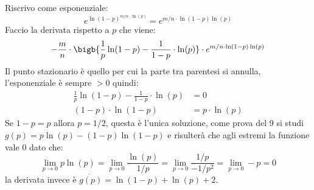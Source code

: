 Riscrivo come esponenziale:
\begin{equation*}
    e^{\ln(1 - p)^{m/n \cdot \ln(p)}} = e^{m/n \cdot \ln(1 - p)\ln(p)}
\end{equation*}
Faccio la derivata rispetto a $p$ che viene:
\begin{equation*}
    -\frac{m}{n} \cdot \bigb{\frac{1}{p}\ln(1 - p) - \frac{1}{1 - p} \cdot \ln(p)} \cdot e^{m/n \cdot \ln(1 - p)\ln(p)}
\end{equation*}
Il punto stazionario è quello per cui la parte tra parentesi si annulla, l'esponenziale è sempre $> 0$ quindi:
\begin{align*}
    \frac{1}{p}\ln(1 - p) - \frac{1}{1 - p} \cdot \ln(p) &= 0\\
    (1 - p) \cdot \ln(1 - p) &= p \cdot \ln(p)
\end{align*}
Se $1 - p = p$ allora $p = 1/2$, questa è l'unica soluzione, come prova del 9 si studi $g(p) = p\ln(p) - (1 - p)\ln(1 - p)$ e risulterà che agli estremi la funzione vale 0 dato che:
\begin{equation*}
    \lim_{p \to 0}p \ln(p) = \lim_{p \to 0} \frac{\ln(p)}{1/p} = \lim_{p \to 0} \frac{1/p}{-1/p^2} = \lim_{p \to 0} -p = 0
\end{equation*}
la derivata invece è $\dot{g(p)} = \ln(1 - p) + \ln(p) + 2$.


